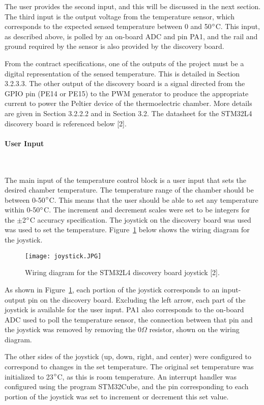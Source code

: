 \documentclass[11pt,letter]{article}
\begin{document}
The user provides the second input, and this will be discussed in the next section. The third input is the output voltage from the temperature sensor, which corresponds to the expected sensed temperature between 0 and 50$\degree$C. This input, as described above, is polled by an on-board ADC and pin PA1, and the rail and ground required by the sensor is also provided by the discovery board. 

From the contract specifications, one of the outputs of the project must be a digital representation of the sensed temperature. This is detailed in Section 3.2.3.3. The other output of the discovery board is a signal directed from the GPIO pin (PE14 or PE15) to the PWM generator to produce the appropriate current to power the Peltier device of the thermoelectric chamber. More details are given in Section 3.2.2.2 and in Section 3.2. The datasheet for the STM32L4 discovery board is referenced below [2].

\paragraph{User Input} \

The main input of the temperature control block is a user input that sets the desired chamber temperature. The temperature range of the chamber should be between 0-50$\degree$C. This means that the user should be able to set any temperature within 0-50$\degree$C. The increment and decrement scales were set to be integers for the $\pm$2$\degree$C accuracy specification. The joystick on the discovery board was used was used to set the temperature. Figure~\ref{fig:joystick} below shows the wiring diagram for the joystick.

\begin{figure}[H]
    \centering
    \texttt{[image: joystick.JPG]}
    \caption{Wiring diagram for the STM32L4 discovery board joystick [2].}
    \label{fig:joystick}
\end{figure}

As shown in Figure~\ref{fig:joystick}, each portion of the joystick corresponds to an input-output pin on the discovery board. Excluding the left arrow, each part of the joystick is available for the user input. PA1 also corresponds to the on-board ADC used to poll the temperature sensor, the connection between that pin and the joystick was removed by removing the 0$\Omega$ resistor, shown on the wiring diagram. 

The other sides of the joystick (up, down, right, and center) were configured to correspond to changes in the set temperature. The original set temperature was initialized to 23$\degree$C, as this is room temperature. An interrupt handler was configured using the program STM32Cube, and the pin corresponding to each portion of the joystick was set to increment or decrement this set value. 
\end{document}
